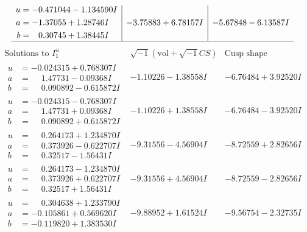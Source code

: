 \documentclass[1p]{elsarticle_modified}
\theoremstyle{definition}
\newcommand{\I}{\sqrt{-1}}
\begin{document}
$$\begin{array}{c|c|c}
\begin{aligned}
u &= -0.471044 - 1.134590 I \\
a &= -1.37055 + 1.28746 I \\
b &= \phantom{-}0.30745 + 1.38445 I\end{aligned}
 & -3.75883 + 6.78157 I & -5.67848 - 6.13587 I\\
 \hline 
 \end{array}$$\newpage$$\begin{array}{c|c|c}  
\text{Solutions to }I^u_{1}& \I (\text{vol} + \sqrt{-1}CS) & \text{Cusp shape}\\
 \hline 
\begin{aligned}
u &= -0.024315 + 0.768307 I \\
a &= \phantom{-}1.47731 - 0.09368 I \\
b &= \phantom{-}0.090892 - 0.615872 I\end{aligned}
 & -1.10226 - 1.38558 I & -6.76484 + 3.92520 I \\ \hline\begin{aligned}
u &= -0.024315 - 0.768307 I \\
a &= \phantom{-}1.47731 + 0.09368 I \\
b &= \phantom{-}0.090892 + 0.615872 I\end{aligned}
 & -1.10226 + 1.38558 I & -6.76484 - 3.92520 I \\ \hline\begin{aligned}
u &= \phantom{-}0.264173 + 1.234870 I \\
a &= \phantom{-}0.373926 - 0.622707 I \\
b &= \phantom{-}0.32517 - 1.56431 I\end{aligned}
 & -9.31556 - 4.56904 I & -8.72559 + 2.82656 I \\ \hline\begin{aligned}
u &= \phantom{-}0.264173 - 1.234870 I \\
a &= \phantom{-}0.373926 + 0.622707 I \\
b &= \phantom{-}0.32517 + 1.56431 I\end{aligned}
 & -9.31556 + 4.56904 I & -8.72559 - 2.82656 I \\ \hline\begin{aligned}
u &= \phantom{-}0.304638 + 1.233790 I \\
a &= -0.105861 + 0.569620 I \\
b &= -0.119820 + 1.383530 I\end{aligned}
 & -9.88952 + 1.61524 I & -9.56754 - 2.32735 I \\ \hline\begin{aligned}

\end{aligned}
\end{array}$$
\end{document}
